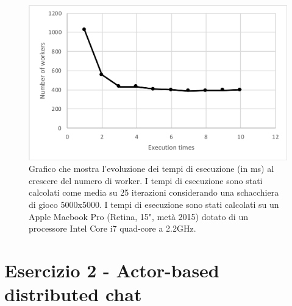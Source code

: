 \documentclass[a4paper]{report}
\begin{document}
\begin{figure}[H]
    \centering
    \includegraphics[width=\linewidth, height=\textheight, keepaspectratio]{res/execution_times.png}
    \caption{Grafico che mostra l'evoluzione dei tempi di esecuzione (in ms) al crescere del numero di worker. I tempi di esecuzione sono stati calcolati come media su 25 iterazioni considerando una schacchiera di gioco 5000x5000. I tempi di esecuzione sono stati calcolati su un Apple Macbook Pro (Retina, 15", metà 2015) dotato di un processore Intel Core i7 quad-core a 2.2GHz.}
    \label{fig:execution-times}
\end{figure}

\chapter{Esercizio 2 - Actor-based distributed chat}
\end{document}
